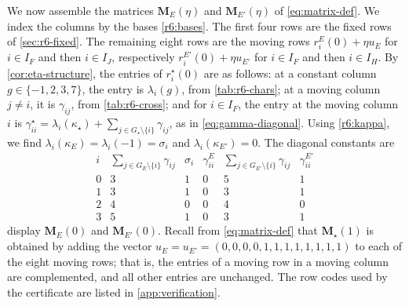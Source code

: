 \documentclass[12pt,oneside,openany]{book}
\theoremstyle{definition}
\theoremstyle{plain}
\numberwithin{equation}{chapter}
\theoremstyle{plain}
\theoremstyle{definition}
\theoremstyle{remark}
\begin{document}
We now assemble the matrices $\mathbf M_E(\eta)$ and $\mathbf M_{E'}(\eta)$ of \eqref{eq:matrix-def}. We index the columns by the bases \eqref{r6:bases}. The first four rows are the fixed rows of \cref{sec:r6-fixed}. The remaining eight rows are the moving rows $r^E_i(0)+\eta u_E$ for $i\in I_F$ and then $i\in I_J$, respectively $r^{E'}_i(0)+\eta u_{E'}$ for $i\in I_F$ and then $i\in I_H$. By \cref{cor:eta-structure}, the entries of $r^\star_i(0)$ are as follows: at a constant column $g\in\{-1,2,3,7\}$, the entry is $\lambda_i(g)$, from \cref{tab:r6-chars}; at a moving column $j\ne i$, it is $\gamma_{ij}$, from \cref{tab:r6-cross}; and for $i\in I_F$, the entry at the moving column $i$ is $\gamma^\star_{ii}=\lambda_i(\kappa_\star)+\sum_{j\in G_\star\setminus\{i\}}\gamma_{ij}$, as in \eqref{eq:gamma-diagonal}. Using \eqref{r6:kappa}, we find $\lambda_i(\kappa_E)=\lambda_i(-1)=\sigma_i$ and $\lambda_i(\kappa_{E'})=0$. The diagonal constants are
\[
\begin{array}{c|ccc|cc}
i & \sum_{j\in G_E\setminus\{i\}}\gamma_{ij} & \sigma_i & \gamma^E_{ii} & \sum_{j\in G_{E'}\setminus\{i\}}\gamma_{ij} & \gamma^{E'}_{ii}\\
\hline
0 & 3 & 1 & 0 & 5 & 1 \\
1 & 3 & 1 & 0 & 3 & 1 \\
2 & 4 & 0 & 0 & 4 & 0 \\
3 & 5 & 1 & 0 & 3 & 1
\end{array}
\]
 display $\mathbf M_E(0)$ and $\mathbf M_{E'}(0)$. Recall from \eqref{eq:matrix-def} that $\mathbf M_\star(1)$ is obtained by adding the vector $u_E=u_{E'}=(0,0,0,0,1,1,1,1,1,1,1,1)$ to each of the eight moving rows; that is, the entries of a moving row in a moving column are complemented, and all other entries are unchanged. The row codes used by the certificate are listed in \cref{app:verification}.
\end{document}
